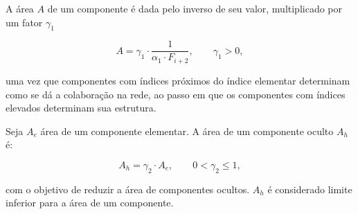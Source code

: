 A área $A$ de um componente é dada pelo inverso de seu valor, multiplicado por
um fator $\gamma_1$

\begin{equation}
	\label{Equation:ComponenteArea}
	A = \gamma_1 \cdot \frac{1}{\alpha_1 \cdot F_{i+2}}, \qquad \gamma_1 > 0,
\end{equation}

\noindent
uma vez que componentes com índices próximos do índice elementar determinam como
se dá a colaboração na rede, ao passo em que os componentes com índices elevados
determinam sua estrutura. 

Seja $A_e$ área de um componente elementar. A área de um componente oculto $A_h$
é:

\begin{equation}
	\label{Equation:HiddenComponenteArea}
	A_h = \gamma_2 \cdot A_e, \qquad  0 < \gamma_2 \leq 1,
\end{equation}

\noindent
com o objetivo de reduzir a área de componentes ocultos. $A_h$ é considerado
limite inferior para a área de um componente.





